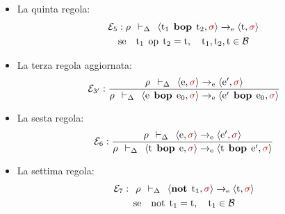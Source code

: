 \documentclass[a4paper]{article}
\begin{document}
\begin{itemize}
 		\item La quinta regola:
 		\begin{gather*}
 			\mathcal{E}_{5} : \rho \:\: \vdash_{\Delta} \:\: \left\langle \mathrm{t}_{1} \:\: \mathbf{bop} \:\: \mathrm{t}_{2}, \textcolor{Red3}{\sigma} \right\rangle \rightarrow_{\mathrm{e}} \left\langle \mathrm{t}, \textcolor{Red3}{\sigma} \right\rangle \\
 			\mathrm{se} \hspace{1em} \mathrm{t}_{1} \:\: \mathrm{op} \:\: \mathrm{t}_{2} = \mathrm{t}, \hspace{1em} \mathrm{t_{1}, t_{2}, t} \in \mathcal{B}
 		\end{gather*}
 		
 		\item La terza regola aggiornata:
 		\begin{equation*}
 			\mathcal{E}_{3'} : \dfrac{
 				\rho \:\: \vdash_{\Delta} \:\: \left\langle \mathrm{e}, \textcolor{Red3}{\sigma} \right\rangle \rightarrow_{\mathrm{e}} \left\langle \mathrm{e}', \textcolor{Red3}{\sigma} \right\rangle
 			}{
 				\rho \:\: \vdash_{\Delta} \:\: \left\langle \mathrm{e} \:\: \mathbf{bop} \:\: \mathrm{e}_{0}, \textcolor{Red3}{\sigma} \right\rangle \rightarrow_{\mathrm{e}} \left\langle \mathrm{e}' \:\: \mathbf{bop} \:\: \mathrm{e}_{0}, \textcolor{Red3}{\sigma} \right\rangle
 			}
 		\end{equation*}
 		
 		\item La sesta regola:
 		\begin{equation*}
 			\mathcal{E}_{6} : \dfrac{
 				\rho \:\: \vdash_{\Delta} \:\: \left\langle \mathrm{e}, \textcolor{Red3}{\sigma} \right\rangle \rightarrow_{\mathrm{e}} \left\langle \mathrm{e}', \textcolor{Red3}{\sigma} \right\rangle
 			}{
 				\rho \:\: \vdash_{\Delta} \:\: \left\langle \mathrm{t} \:\: \mathbf{bop} \:\: \mathrm{e}, \textcolor{Red3}{\sigma} \right\rangle \rightarrow_{\mathrm{e}} \left\langle \mathrm{t} \:\: \mathbf{bop} \:\: \mathrm{e}', \textcolor{Red3}{\sigma} \right\rangle
 			}
 		\end{equation*}
 		
 		\item La settima regola:
 		\begin{gather*}
 			\mathcal{E}_{7} : \:\: \rho \:\: \vdash_{\Delta} \:\: \left\langle \mathbf{not} \:\: \mathrm{t}_{1}, \textcolor{Red3}{\sigma} \right\rangle \rightarrow_{\mathrm{e}} \left\langle \mathrm{t}, \textcolor{Red3}{\sigma} \right\rangle \\
 			\mathrm{se} \hspace{1em} \mathrm{not} \:\: \mathrm{t}_{1} = \mathrm{t}, \hspace{1em} \mathrm{t}_{1} \in \mathcal{B}
 		\end{gather*}
 		

\end{itemize}
\end{document}
